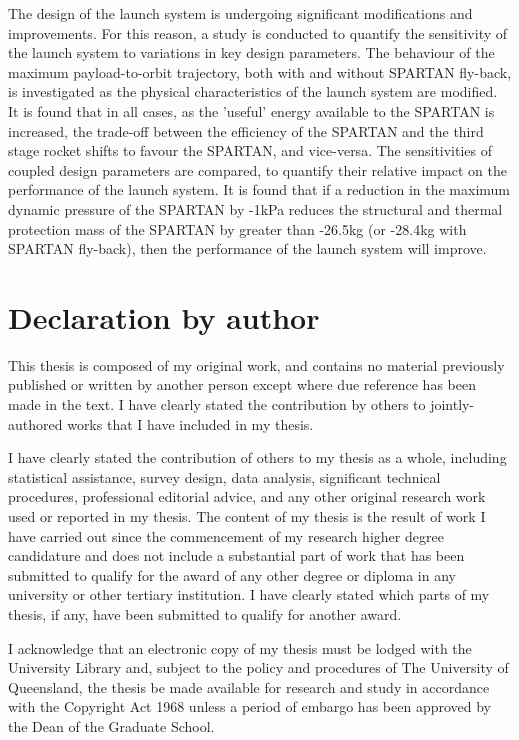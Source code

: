 The design of the launch system is undergoing significant modifications and improvements.
For this reason, a study is conducted to quantify the sensitivity of the launch system to variations in key design parameters. The behaviour of the maximum payload-to-orbit trajectory, both with and without SPARTAN fly-back, is investigated as the physical characteristics of the launch system are modified. 
It is found that in all cases, as the 'useful' energy available to the SPARTAN is increased, the trade-off between the efficiency of the SPARTAN and the third stage rocket shifts to favour the SPARTAN, and vice-versa.
The sensitivities of coupled design parameters are compared, to quantify their relative impact on the performance of the launch system. It is found that if a reduction in the maximum dynamic pressure of the SPARTAN by -1kPa reduces the structural and thermal protection mass of the SPARTAN by greater than -26.5kg (or -28.4kg with SPARTAN fly-back), then the performance of the launch system will improve. 

 

\clearpage
\section*{Declaration by author}

  This thesis is composed of my original work, and contains no material previously published or written by another person except where due reference has been made in the text. I have clearly stated the contribution by others to jointly-authored works that I have included in my thesis.

  I have clearly stated the contribution of others to my thesis as a whole, including statistical assistance, survey design, data analysis, significant technical procedures, professional editorial advice, and any other original research work used or reported in my thesis. The content of my thesis is the result of work I have carried out since the commencement of my research higher degree candidature and does not include a substantial part of work that has been submitted to qualify for the award of any other degree or diploma in any university or other tertiary institution. I have clearly stated which parts of my thesis, if any, have been submitted to qualify for another award.

  I acknowledge that an electronic copy of my thesis must be lodged with the University Library and, subject to the policy and procedures of The University of Queensland, the thesis be made available for research and study in accordance with the Copyright Act 1968 unless a period of embargo has been approved by the Dean of the Graduate School.

